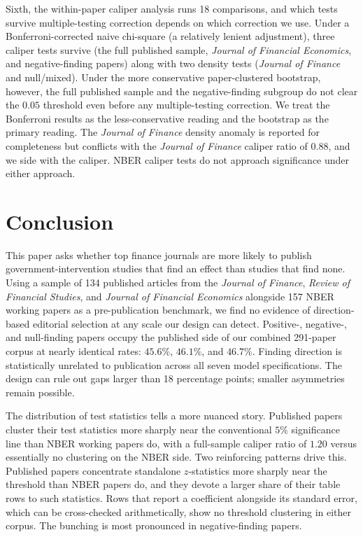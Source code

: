 \documentclass[12pt]{article}
\newcommand{\JF}{\textit{Journal of Finance}}
\newcommand{\RFS}{\textit{Review of Financial Studies}}
\newcommand{\JFE}{\textit{Journal of Financial Economics}}
\begin{document}
Sixth, the within-paper caliper analysis runs 18
comparisons, and which tests survive multiple-testing correction
depends on which correction we use.  Under a Bonferroni-corrected
naive chi-square (a relatively lenient adjustment), three caliper
tests survive (the full published sample, \JFE{}, and
negative-finding papers) along with two density tests (\JF{} and
null/mixed).  Under the more conservative paper-clustered bootstrap,
however, the full published sample and the negative-finding
subgroup do not clear the $0.05$ threshold even before any
multiple-testing correction.  We treat the Bonferroni results as
the less-conservative reading and the bootstrap as the primary
reading.  The \JF{} density anomaly is reported for completeness
but conflicts with the \JF{} caliper ratio of $0.88$, and we side
with the caliper.  NBER caliper tests do not approach significance
under either approach.

\section{Conclusion}
\label{sec:conclusion}

This paper asks whether top finance journals are more likely to
publish government-intervention studies that find an effect than
studies that find none.  Using a sample of 134 published articles
from the \JF{}, \RFS{}, and \JFE{} alongside 157 NBER working
papers as a pre-publication benchmark, we find no evidence of
direction-based editorial selection at any scale our design can
detect.  Positive-, negative-, and null-finding papers occupy the
published side of our combined 291-paper corpus at nearly identical
rates: $45.6\%$, $46.1\%$, and $46.7\%$.  Finding direction is
statistically unrelated to publication across all seven model
specifications.  The design can rule out gaps larger than 18
percentage points; smaller asymmetries remain possible.

The distribution of test statistics tells a more nuanced story.
Published papers cluster their test statistics more sharply near
the conventional $5\%$ significance line than NBER working papers
do, with a full-sample caliper ratio of $1.20$ versus essentially
no clustering on the NBER side.  Two reinforcing patterns drive
this.  Published papers concentrate standalone $z$-statistics more
sharply near the threshold than NBER papers do, and they devote a
larger share of their table rows to such statistics.  Rows that
report a coefficient alongside its standard error, which can be
cross-checked arithmetically, show no threshold clustering in
either corpus.  The bunching is most pronounced in negative-finding
papers.
\end{document}
